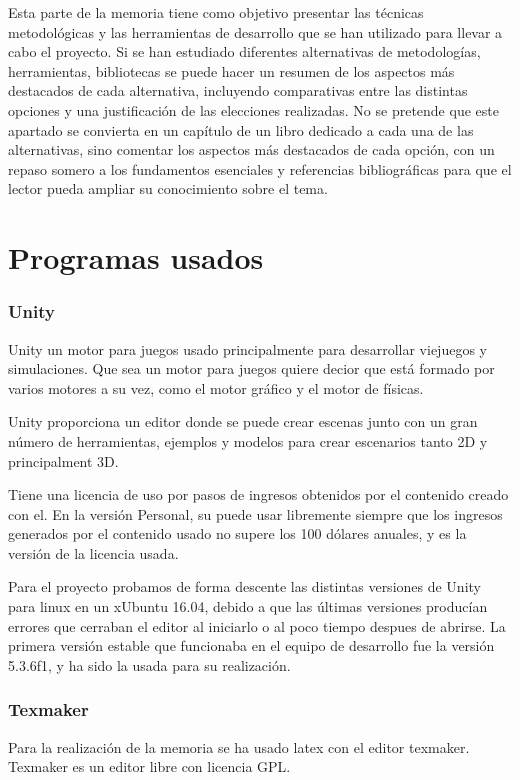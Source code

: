 
Esta parte de la memoria tiene como objetivo presentar las técnicas metodológicas y las herramientas de desarrollo que se han utilizado para llevar a cabo el proyecto. Si se han estudiado diferentes alternativas de metodologías, herramientas, bibliotecas se puede hacer un resumen de los aspectos más destacados de cada alternativa, incluyendo comparativas entre las distintas opciones y una justificación de las elecciones realizadas. 
No se pretende que este apartado se convierta en un capítulo de un libro dedicado a cada una de las alternativas, sino comentar los aspectos más destacados de cada opción, con un repaso somero a los fundamentos esenciales y referencias bibliográficas para que el lector pueda ampliar su conocimiento sobre el tema.


\section{Programas usados}

\subsubsection{Unity}
Unity un motor para juegos usado principalmente para desarrollar viejuegos y simulaciones. Que sea un motor para juegos quiere decior que está formado por varios motores a su vez, como el motor gráfico y el motor de físicas.

Unity proporciona un editor donde se puede crear escenas junto con un gran número de herramientas, ejemplos y modelos para crear escenarios tanto 2D y principalment 3D.

Tiene una licencia de uso por pasos de ingresos obtenidos por el contenido creado con el. En la versión Personal, su puede usar libremente siempre que los ingresos generados por el contenido usado no supere los 100 dólares anuales, y es la versión de la licencia usada.

Para el proyecto probamos de forma descente las distintas versiones de Unity para linux en un xUbuntu 16.04, debido a que las últimas versiones producían errores que cerraban el editor al iniciarlo o al poco tiempo despues de abrirse. La primera versión estable que funcionaba en el equipo de desarrollo fue la versión 5.3.6f1, y ha sido la usada para su realización.

\subsubsection{Texmaker}
Para la realización de la memoria se ha usado latex con el editor texmaker.
Texmaker es un editor libre con licencia GPL.

